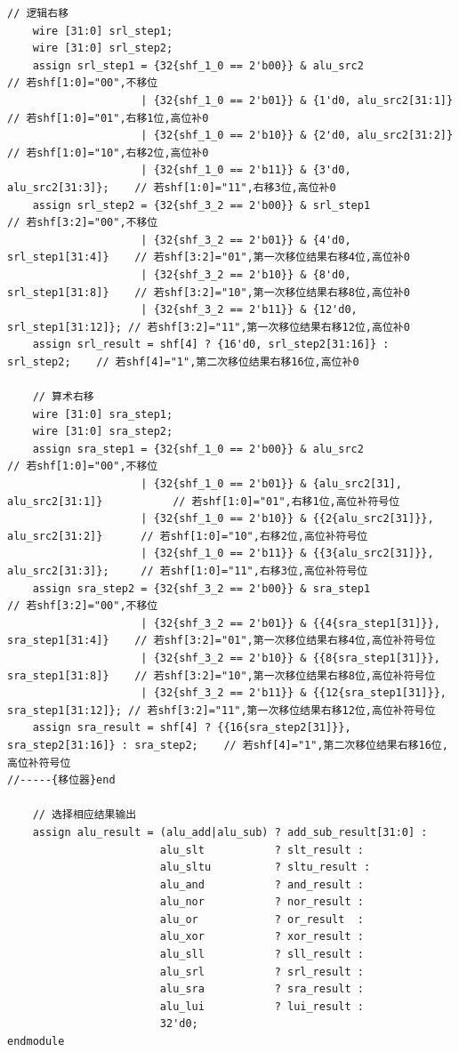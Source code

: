 \documentclass[AutoFakeBold]{LZUThesis}
\begin{document}
\begin{lstlisting}[style=verilog-style]
    // 逻辑右移
    wire [31:0] srl_step1;
    wire [31:0] srl_step2;
    assign srl_step1 = {32{shf_1_0 == 2'b00}} & alu_src2                   // 若shf[1:0]="00",不移位
                     | {32{shf_1_0 == 2'b01}} & {1'd0, alu_src2[31:1]}     // 若shf[1:0]="01",右移1位,高位补0
                     | {32{shf_1_0 == 2'b10}} & {2'd0, alu_src2[31:2]}     // 若shf[1:0]="10",右移2位,高位补0
                     | {32{shf_1_0 == 2'b11}} & {3'd0, alu_src2[31:3]};    // 若shf[1:0]="11",右移3位,高位补0
    assign srl_step2 = {32{shf_3_2 == 2'b00}} & srl_step1                  // 若shf[3:2]="00",不移位
                     | {32{shf_3_2 == 2'b01}} & {4'd0, srl_step1[31:4]}    // 若shf[3:2]="01",第一次移位结果右移4位,高位补0
                     | {32{shf_3_2 == 2'b10}} & {8'd0, srl_step1[31:8]}    // 若shf[3:2]="10",第一次移位结果右移8位,高位补0
                     | {32{shf_3_2 == 2'b11}} & {12'd0, srl_step1[31:12]}; // 若shf[3:2]="11",第一次移位结果右移12位,高位补0
    assign srl_result = shf[4] ? {16'd0, srl_step2[31:16]} : srl_step2;    // 若shf[4]="1",第二次移位结果右移16位,高位补0
 
    // 算术右移
    wire [31:0] sra_step1;
    wire [31:0] sra_step2;
    assign sra_step1 = {32{shf_1_0 == 2'b00}} & alu_src2                                 // 若shf[1:0]="00",不移位
                     | {32{shf_1_0 == 2'b01}} & {alu_src2[31], alu_src2[31:1]}           // 若shf[1:0]="01",右移1位,高位补符号位
                     | {32{shf_1_0 == 2'b10}} & {{2{alu_src2[31]}}, alu_src2[31:2]}      // 若shf[1:0]="10",右移2位,高位补符号位
                     | {32{shf_1_0 == 2'b11}} & {{3{alu_src2[31]}}, alu_src2[31:3]};     // 若shf[1:0]="11",右移3位,高位补符号位
    assign sra_step2 = {32{shf_3_2 == 2'b00}} & sra_step1                                // 若shf[3:2]="00",不移位
                     | {32{shf_3_2 == 2'b01}} & {{4{sra_step1[31]}}, sra_step1[31:4]}    // 若shf[3:2]="01",第一次移位结果右移4位,高位补符号位
                     | {32{shf_3_2 == 2'b10}} & {{8{sra_step1[31]}}, sra_step1[31:8]}    // 若shf[3:2]="10",第一次移位结果右移8位,高位补符号位
                     | {32{shf_3_2 == 2'b11}} & {{12{sra_step1[31]}}, sra_step1[31:12]}; // 若shf[3:2]="11",第一次移位结果右移12位,高位补符号位
    assign sra_result = shf[4] ? {{16{sra_step2[31]}}, sra_step2[31:16]} : sra_step2;    // 若shf[4]="1",第二次移位结果右移16位,高位补符号位
//-----{移位器}end

    // 选择相应结果输出
    assign alu_result = (alu_add|alu_sub) ? add_sub_result[31:0] : 
                        alu_slt           ? slt_result :
                        alu_sltu          ? sltu_result :
                        alu_and           ? and_result :
                        alu_nor           ? nor_result :
                        alu_or            ? or_result  :
                        alu_xor           ? xor_result :
                        alu_sll           ? sll_result :
                        alu_srl           ? srl_result :
                        alu_sra           ? sra_result :
                        alu_lui           ? lui_result :
                        32'd0;
endmodule
\end{lstlisting}
\end{document}
